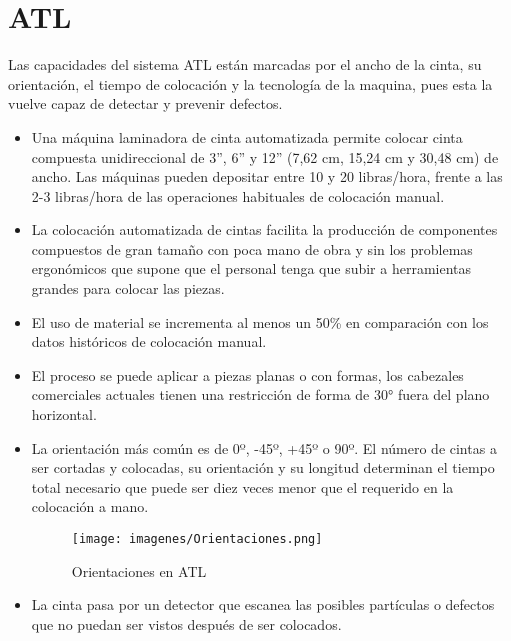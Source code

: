 \section{ATL}

Las capacidades del sistema ATL están marcadas por el ancho de la cinta, su orientación, el tiempo de colocación y la tecnología de la maquina, pues esta la vuelve capaz de detectar y prevenir defectos.
\begin{itemize}
    \item Una máquina laminadora de cinta automatizada permite colocar cinta compuesta unidireccional de 3”, 6” y 12” (7,62 cm, 15,24 cm y 30,48 cm) de ancho. Las máquinas pueden depositar entre 10 y 20 libras/hora, frente a las 2-3 libras/hora de las operaciones habituales de colocación manual.
    \item La colocación automatizada de cintas facilita la producción de componentes compuestos de gran tamaño con poca mano de obra y sin los problemas ergonómicos que supone que el personal tenga que subir a herramientas grandes para colocar las piezas.
    \item El uso de material se incrementa al menos un 50\% en comparación con los datos históricos de colocación manual.
    \item El proceso se puede aplicar a piezas planas o con formas, los cabezales comerciales actuales tienen una restricción de forma de 30° fuera del plano horizontal.
    \item La orientación más común es de 0º, -45º, +45º o 90º. El número de cintas a ser cortadas y colocadas, su orientación y su longitud determinan el tiempo total necesario que puede ser diez veces menor que el requerido en la colocación a mano.%
    \begin{figure}[h]
        \centering
        \texttt{[image: imagenes/Orientaciones.png]}
        \caption{Orientaciones en ATL}
        \label{fig:enter-label}
    \end{figure}
    \item  La cinta pasa por un detector que escanea las posibles partículas o defectos que no puedan ser vistos después de ser colocados.
\end{itemize}

\textbf{}
